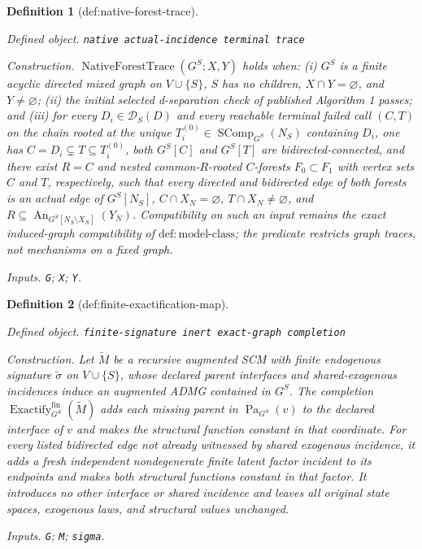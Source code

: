\documentclass{article}
\newtheorem{definition}{Definition}
\begin{document}
\begin{definition}[def:native-forest-trace]\label{def:native-forest-trace}
\par\smallskip\noindent\emph{Defined object.} \texttt{native actual-\allowbreak{}incidence terminal trace}
\par\smallskip\noindent\emph{Construction.} \(\operatorname{NativeForestTrace}(G^S;X,Y)\) holds when: (i) \(G^S\) is a finite acyclic directed mixed graph on \(V\cup\{S\}\), \(S\) has no children, \(X\cap Y=\varnothing\), and \(Y\ne\varnothing\); (ii) the initial selected d-separation check of published Algorithm 1 passes; and (iii) for every \(D_i\in\mathcal D_S(D)\) and every reachable terminal failed call \((C,T)\) on the chain rooted at the unique \(T_i^{(0)}\in\operatorname{SComp}_{G^S}(N_S)\) containing \(D_i\), one has \(C=D_i\subsetneq T\subseteq T_i^{(0)}\), both \(G^S[C]\) and \(G^S[T]\) are bidirected-connected, and there exist \(R=C\) and nested common-\(R\)-rooted \(C\)-forests \(F_0\subset F_1\) with vertex sets \(C\) and \(T\), respectively, such that every directed and bidirected edge of both forests is an actual edge of \(G^S[N_S]\), \(C\cap X_N=\varnothing\), \(T\cap X_N\ne\varnothing\), and \(R\subseteq\operatorname{An}_{G^S[N_S\setminus X_N]}(Y_N)\). Compatibility on such an input remains the exact induced-graph compatibility of \(\mathrm{def:model\text{-}class}\); the predicate restricts graph traces, not mechanisms on a fixed graph.
\par\smallskip\noindent\emph{Inputs.} \texttt{G}; \texttt{X}; \texttt{Y}.
\end{definition}

\begin{definition}[def:finite-exactification-map]\label{def:finite-exactification-map}
\par\smallskip\noindent\emph{Defined object.} \texttt{finite-\allowbreak{}signature inert exact-\allowbreak{}graph completion}
\par\smallskip\noindent\emph{Construction.} Let \(\widetilde M\) be a recursive augmented SCM with finite endogenous signature \(\widetilde\sigma\) on \(V\cup\{S\}\), whose declared parent interfaces and shared-exogenous incidences induce an augmented ADMG contained in \(G^S\). The completion \(\operatorname{Exactify}^{\mathrm{fin}}_{G^S}(\widetilde M)\) adds each missing parent in \(\operatorname{Pa}_{G^S}(v)\) to the declared interface of \(v\) and makes the structural function constant in that coordinate. For every listed bidirected edge not already witnessed by shared exogenous incidence, it adds a fresh independent nondegenerate finite latent factor incident to its endpoints and makes both structural functions constant in that factor. It introduces no other interface or shared incidence and leaves all original state spaces, exogenous laws, and structural values unchanged.
\par\smallskip\noindent\emph{Inputs.} \texttt{G}; \texttt{M}; \texttt{sigma}.
\end{definition}
\end{document}

